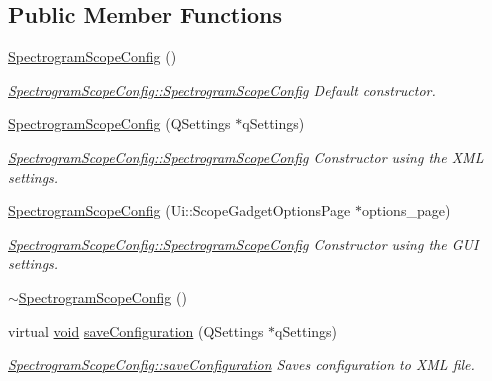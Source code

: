 \subsection*{Public Member Functions}
\begin{DoxyCompactItemize}
\item 
\hyperlink{group___scope_plugin_ga28b2d6eb7e9d8b459d67cef767b92fc5}{Spectrogram\-Scope\-Config} ()
\begin{DoxyCompactList}\small\item\em \hyperlink{group___scope_plugin_ga28b2d6eb7e9d8b459d67cef767b92fc5}{Spectrogram\-Scope\-Config\-::\-Spectrogram\-Scope\-Config} Default constructor. \end{DoxyCompactList}\item 
\hyperlink{group___scope_plugin_ga8acde1e8cd1057e318cdccaa2d2935b4}{Spectrogram\-Scope\-Config} (Q\-Settings $\ast$q\-Settings)
\begin{DoxyCompactList}\small\item\em \hyperlink{group___scope_plugin_ga28b2d6eb7e9d8b459d67cef767b92fc5}{Spectrogram\-Scope\-Config\-::\-Spectrogram\-Scope\-Config} Constructor using the X\-M\-L settings. \end{DoxyCompactList}\item 
\hyperlink{group___scope_plugin_ga40e298cc36738756669408e5cb4d4166}{Spectrogram\-Scope\-Config} (Ui\-::\-Scope\-Gadget\-Options\-Page $\ast$options\-\_\-page)
\begin{DoxyCompactList}\small\item\em \hyperlink{group___scope_plugin_ga28b2d6eb7e9d8b459d67cef767b92fc5}{Spectrogram\-Scope\-Config\-::\-Spectrogram\-Scope\-Config} Constructor using the G\-U\-I settings. \end{DoxyCompactList}\item 
\hyperlink{group___scope_plugin_ga12537968c75d08027a1490766226d871}{$\sim$\-Spectrogram\-Scope\-Config} ()
\item 
virtual \hyperlink{group___u_a_v_objects_plugin_ga444cf2ff3f0ecbe028adce838d373f5c}{void} \hyperlink{group___scope_plugin_ga11e36d400c5929b6feb7c6e2fb0ba30f}{save\-Configuration} (Q\-Settings $\ast$q\-Settings)
\begin{DoxyCompactList}\small\item\em \hyperlink{group___scope_plugin_ga11e36d400c5929b6feb7c6e2fb0ba30f}{Spectrogram\-Scope\-Config\-::save\-Configuration} Saves configuration to X\-M\-L file. \end{DoxyCompactList}\item 

\end{DoxyCompactItemize}
